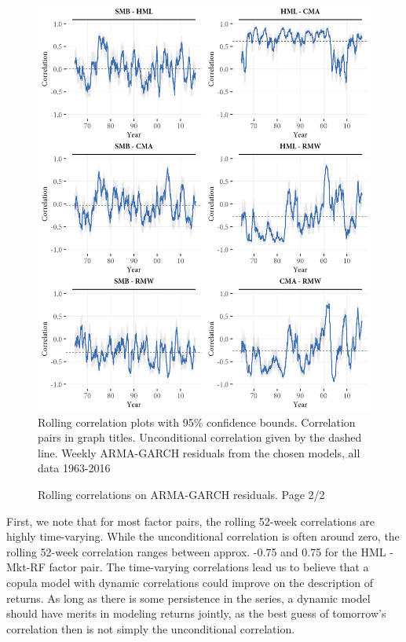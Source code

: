 \begin{figure}[htbp]
  \caption{Rolling correlations on ARMA-GARCH residuals. Page 2/2}
  \label{fig:rolling2}
  \centering
  \begin{minipage}{\textwidth}
  \includegraphics[scale=1]{graphics/rolling2.png}  
  \vspace{3mm}
  \footnotesize
  Rolling correlation plots with 95\% confidence bounds. Correlation pairs in graph titles. Unconditional correlation given by the dashed line. Weekly ARMA-GARCH residuals from the chosen models, all data 1963-2016
  \end{minipage}
\end{figure}
First, we note that for most factor pairs, the rolling 52-week correlations are highly time-varying. While the unconditional correlation is often around zero, the rolling 52-week correlation ranges between approx. -0.75 and 0.75 for the HML - Mkt-RF factor pair. The time-varying correlations lead us to believe that a copula model with dynamic correlations could improve on the description of returns. As long as there is some persistence in the series, a dynamic model should have merits in modeling returns jointly, as the best guess of tomorrow's correlation then is not simply the unconditional correlation.

